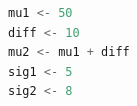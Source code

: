 \begin{lstlisting}[language=c++,label={code:20_02},caption={平均値差の設定}]
mu1 <- 50
diff <- 10
mu2 <- mu1 + diff
sig1 <- 5
sig2 <- 8
\end{lstlisting}
